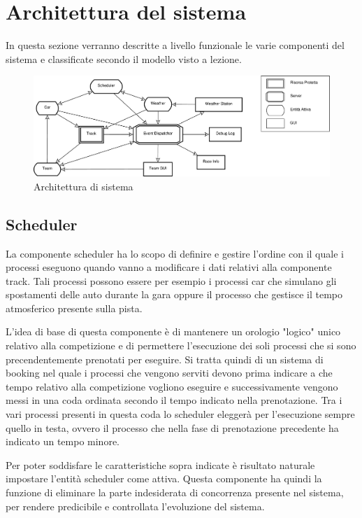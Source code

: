 \documentclass[11pt,a4paper]{report}
\begin{document}
\chapter{Architettura del sistema}
In questa sezione verranno descritte a livello funzionale le varie componenti del sistema e classificate secondo il modello visto a lezione.
\begin{landscape}
\begin{figure}
\includegraphics[height=.25\paperheight]{diagrammi/Arch}
\caption{Architettura di sistema}
\label{fig:architettura}
\end{figure}
\end{landscape}

\section{Scheduler}
La componente scheduler ha lo scopo di definire e gestire l'ordine con il quale i processi eseguono quando vanno a modificare i dati relativi alla componente track.
Tali processi possono essere per esempio i processi car che simulano gli spostamenti delle auto durante la gara oppure il processo che gestisce il tempo atmosferico
presente sulla pista.

L'idea di base di questa componente è di mantenere un orologio "logico" unico relativo alla competizione e di permettere l'esecuzione dei soli processi che si sono precendentemente prenotati per eseguire. Si tratta quindi di un sistema di booking nel quale i processi che vengono serviti devono prima indicare a che tempo relativo alla competizione vogliono eseguire e successivamente vengono messi in una coda ordinata secondo il tempo indicato nella prenotazione. Tra i vari processi presenti in questa coda lo scheduler eleggerà per l'esecuzione sempre quello in testa, ovvero il processo che nella fase di prenotazione precedente ha indicato un tempo minore.

Per poter soddisfare le caratteristiche sopra indicate è risultato naturale impostare l'entità scheduler come attiva.
Questa componente ha quindi la funzione di eliminare la parte indesiderata di concorrenza presente nel sistema, per rendere predicibile e controllata l'evoluzione del sistema.
\end{document}
